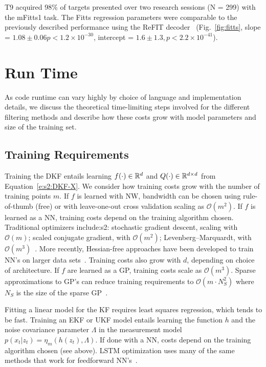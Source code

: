 T9 acquired 98\% of targets presented over two research sessions (N = 299) with the mFitts1 task. The Fitts regression parameters were comparable to the previously described performance using the ReFIT decoder~\cite{Gil15} (Fig.~\ref{fig:fitts}, slope = $1.08 \pm 0.06 p < 1.2 \times 10^{-30}$, intercept = $1.6  \pm 1.3, p < 2.2 \times 10^{-41}$).

\section{Run Time}
As code runtime can vary highly by choice of language and implementation details, we discuss the theoretical time-limiting steps involved for the different filtering methods and describe how these costs grow with model parameters and size of the training set.

\subsection{Training Requirements}
Training the DKF entails learning $f(\cdot)\in\mathbb{R}^d$ and $Q(\cdot)\in\mathbb{R}^{d\times d}$ from Equation~\ref{e:s2:DKF-X}.  We consider how training costs grow with the number of training points $m$.  If $f$ is learned with NW, bandwidth can be chosen using rule-of-thumb (free) or with leave-one-out cross validation scaling as $\mathcal{O}(m^2)$. If $f$ is learned as a NN, training costs depend on the training algorithm chosen.  Traditional optimizers include:s2: stochastic gradient descent, scaling with $\mathcal{O}(m)$; scaled conjugate gradient, with $\mathcal{O}(m^2)$; Levenberg--Marquardt, with $\mathcal{O}(m^3)$~\cite{Cas06}.  More recently, Hessian-free approaches have been developed to train NN's on larger data sets~\cite{Sch15}.  Training costs also grow with $d$, depending on choice of architecture.  If $f$ are learned as a GP, training costs scale as $\mathcal{O}(m^3)$.  Sparse approximations to GP's can reduce training requirements to $\mathcal{O}(m\cdot N_S^2)$ where $N_S$ is the size of the sparse GP~\cite{Qui05}.

Fitting a linear model for the KF requires least squares regression, which tends to be fast.  Training an EKF or UKF model entails learning the function $h$  and the noise covariance parameter $\Lambda$ in the measurement model ${p(x_t|z_t) = \eta_m(h(z_t),\Lambda)}$.  If done with a NN, costs depend on the training algorithm chosen (see above).  LSTM optimization uses many of the same methods that work for feedforward NN's~\cite{Sch15}.

